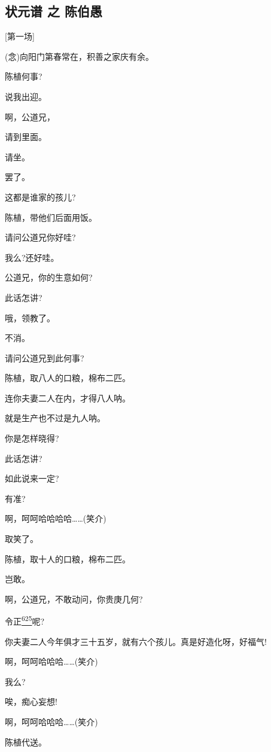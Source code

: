 \newpage
{}
\hypertarget{ux72b6ux5143ux8c31-ux4e4b-ux9648ux4f2fux611a}{%
\subsection{状元谱 之
陈伯愚}\label{ux72b6ux5143ux8c31-ux4e4b-ux9648ux4f2fux611a}}

{[}第一场{]}

(念)向阳门第春常在，积善之家庆有余。

陈植何事?

说我出迎。

啊，公道兄，

请到里面。

请坐。

罢了。

这都是谁家的孩儿?

陈植，带他们后面用饭。

请问公道兄你好哇?

我么?还好哇。

公道兄，你的生意如何?

此话怎讲?

哦，领教了。

不消。

请问公道兄到此何事?

陈植，取八人的口粮，棉布二匹。

连你夫妻二人在内，才得八人呐。

就是生产也不过是九人呐。

你是怎样晓得?

此话怎讲?

如此说来一定?

有准?

啊，呵呵哈哈哈哈\ldots{}\ldots{}(笑介)

取笑了。

陈植，取十人的口粮，棉布二匹。

岂敢。

啊，公道兄，不敢动问，你贵庚几何?

令正\protect\hyperlink{fn625}{\textsuperscript{625}}呢?

你夫妻二人今年俱才三十五岁，就有六个孩儿。真是好造化呀，好福气!

啊，呵呵哈哈哈\ldots{}\ldots{}(笑介)

我么?

唉，痴心妄想!

啊，呵呵哈哈哈\ldots{}\ldots{}(笑介)

陈植代送。


